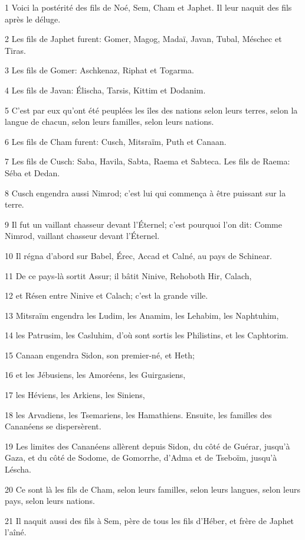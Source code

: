 \par 1 Voici la postérité des fils de Noé, Sem, Cham et Japhet. Il leur naquit des fils après le déluge.
\par 2 Les fils de Japhet furent: Gomer, Magog, Madaï, Javan, Tubal, Méschec et Tiras.
\par 3 Les fils de Gomer: Aschkenaz, Riphat et Togarma.
\par 4 Les fils de Javan: Élischa, Tarsis, Kittim et Dodanim.
\par 5 C'est par eux qu'ont été peuplées les îles des nations selon leurs terres, selon la langue de chacun, selon leurs familles, selon leurs nations.
\par 6 Les fils de Cham furent: Cusch, Mitsraïm, Puth et Canaan.
\par 7 Les fils de Cusch: Saba, Havila, Sabta, Raema et Sabteca. Les fils de Raema: Séba et Dedan.
\par 8 Cusch engendra aussi Nimrod; c'est lui qui commença à être puissant sur la terre.
\par 9 Il fut un vaillant chasseur devant l'Éternel; c'est pourquoi l'on dit: Comme Nimrod, vaillant chasseur devant l'Éternel.
\par 10 Il régna d'abord sur Babel, Érec, Accad et Calné, au pays de Schinear.
\par 11 De ce pays-là sortit Assur; il bâtit Ninive, Rehoboth Hir, Calach,
\par 12 et Résen entre Ninive et Calach; c'est la grande ville.
\par 13 Mitsraïm engendra les Ludim, les Anamim, les Lehabim, les Naphtuhim,
\par 14 les Patrusim, les Casluhim, d'où sont sortis les Philistins, et les Caphtorim.
\par 15 Canaan engendra Sidon, son premier-né, et Heth;
\par 16 et les Jébusiens, les Amoréens, les Guirgasiens,
\par 17 les Héviens, les Arkiens, les Siniens,
\par 18 les Arvadiens, les Tsemariens, les Hamathiens. Ensuite, les familles des Cananéens se dispersèrent.
\par 19 Les limites des Cananéens allèrent depuis Sidon, du côté de Guérar, jusqu'à Gaza, et du côté de Sodome, de Gomorrhe, d'Adma et de Tseboïm, jusqu'à Léscha.
\par 20 Ce sont là les fils de Cham, selon leurs familles, selon leurs langues, selon leurs pays, selon leurs nations.
\par 21 Il naquit aussi des fils à Sem, père de tous les fils d'Héber, et frère de Japhet l'aîné.
